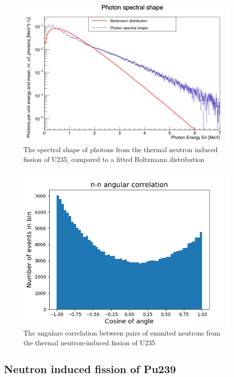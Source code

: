 \documentclass[]{article}
\begin{document}
\begin{figure} [H]
	\centering
	\includegraphics[scale=0.34]{U235_ph_spectral_shape.png}
	\caption{The spectral shape of photons from the thermal neutron induced fission of U235, compared to a fitted Boltzmann distribution}
	\label{fig:U235_ph_spectral_shape}
\end{figure}

\begin{figure} [H]
	\centering
	\includegraphics[scale=0.65]{U235_n_n_ang_corr.png}
	\caption{The angulare correlation between pairs of emmited neutrons from the thermal neutron-induced fission of U235}
	\label{fig:U235_n_n_ang_corr}
\end{figure}


\subsection{Neutron induced fission of Pu239}
\end{document}
